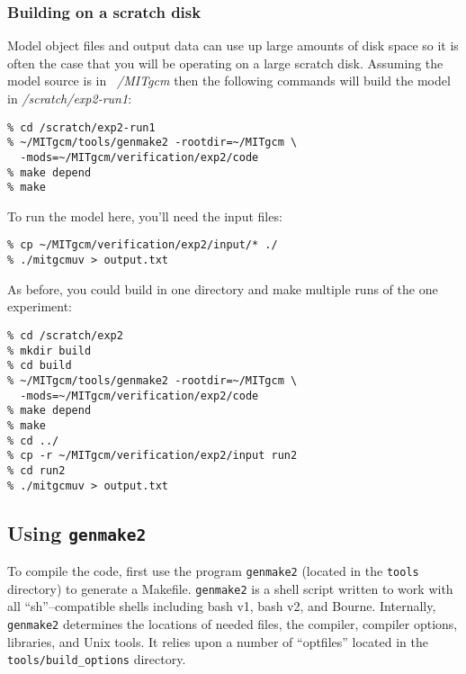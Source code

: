 \subsubsection{Building on a scratch disk}

Model object files and output data can use up large amounts of disk
space so it is often the case that you will be operating on a large
scratch disk. Assuming the model source is in {\em ~/MITgcm} then the
following commands will build the model in {\em /scratch/exp2-run1}:
\begin{verbatim}
% cd /scratch/exp2-run1
% ~/MITgcm/tools/genmake2 -rootdir=~/MITgcm \
  -mods=~/MITgcm/verification/exp2/code
% make depend
% make
\end{verbatim}
To run the model here, you'll need the input files:
\begin{verbatim}
% cp ~/MITgcm/verification/exp2/input/* ./
% ./mitgcmuv > output.txt
\end{verbatim}

As before, you could build in one directory and make multiple runs of
the one experiment:
\begin{verbatim}
% cd /scratch/exp2
% mkdir build
% cd build
% ~/MITgcm/tools/genmake2 -rootdir=~/MITgcm \
  -mods=~/MITgcm/verification/exp2/code
% make depend
% make
% cd ../
% cp -r ~/MITgcm/verification/exp2/input run2
% cd run2
% ./mitgcmuv > output.txt
\end{verbatim}


\subsection{Using \texttt{genmake2}}
\label{sect:genmake}

To compile the code, first use the program \texttt{genmake2} (located
in the \texttt{tools} directory) to generate a Makefile.
\texttt{genmake2} is a shell script written to work with all
``sh''--compatible shells including bash v1, bash v2, and Bourne.
Internally, \texttt{genmake2} determines the locations of needed
files, the compiler, compiler options, libraries, and Unix tools.  It
relies upon a number of ``optfiles'' located in the
\texttt{tools/build\_options} directory.

